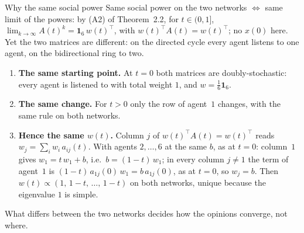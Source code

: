 \begin{frame}[label=m-fdg-why]{Why the same social power}
  \small
  Same social power on the two networks $\iff$ same limit of the powers: by (A2) of
  Theorem~2.2, for $t \in (0,1]$, $\lim_{k \to \infty} A(t)^k = \mathbf{1}_6\, w(t)^\top$,
  with $w(t)^\top A(t) = w(t)^\top$; no $x(0)$ here. Yet the two matrices are different:
  on the directed cycle every agent listens to one agent, on the bidirectional ring to two.

  \medskip
  \begin{enumerate}
    \setlength{\itemsep}{4pt}
    \item \textbf{The same starting point.} At $t = 0$ both matrices are doubly-stochastic:
          every agent is listened to with total weight $1$, and $w = \frac16\mathbf{1}_6$.
    \item \textbf{The same change.} For $t > 0$ only the row of agent~$1$ changes, with the
          same rule on both networks.
    \item \textbf{Hence the same $w(t)$.} Column $j$ of $w(t)^\top A(t) = w(t)^\top$ reads
          $w_j = \sum_i w_i\, a_{ij}(t)$. With agents $2, \dots, 6$ at the same $b$, as at
          $t = 0$: column~$1$ gives $w_1 = t\, w_1 + b$, i.e.\ $b = (1-t)\, w_1$; in every
          column $j \neq 1$ the term of agent~$1$ is $(1-t)\, a_{1j}(0)\, w_1 = b\,
          a_{1j}(0)$, as at $t = 0$, so $w_j = b$. Then
          $w(t) \propto (1,\, 1-t,\, \dots,\, 1-t)$ on both networks, unique because the
          eigenvalue $1$ is simple.
  \end{enumerate}

  \medskip
  \alert{What differs between the two networks decides how the opinions converge, not
  where.}
\end{frame}
